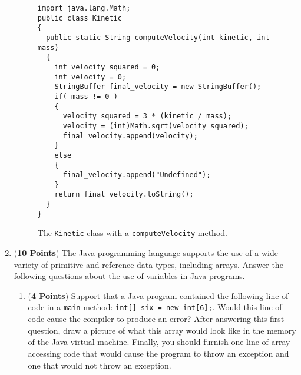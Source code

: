 \documentclass[12pt]{article}
\begin{document}
\begin{enumerate}
\begin{enumerate}






\end{enumerate}

\begin{figure}[p]

\begin{verbatim}
import java.lang.Math;
public class Kinetic
{
  public static String computeVelocity(int kinetic, int mass)
  {
    int velocity_squared = 0;
    int velocity = 0;
    StringBuffer final_velocity = new StringBuffer();
    if( mass != 0 )
    {
      velocity_squared = 3 * (kinetic / mass);
      velocity = (int)Math.sqrt(velocity_squared);
      final_velocity.append(velocity);
    }
    else
    {
      final_velocity.append("Undefined");
    }
    return final_velocity.toString();
  }
}
\end{verbatim}

\caption{The {\tt Kinetic} class with a {\tt computeVelocity} method.}
\label{Kinetic}

\end{figure}

\newpage

\item ({\bf 10 Points}) The Java programming language supports the use
  of a wide variety of primitive and reference data types, including
  arrays.  Answer the following questions about the use of variables
  in Java programs.

\begin{enumerate}

\item ({\bf 4 Points}) Support that a Java program contained the
  following line of code in a {\tt main} method: {\tt int[] six = new
    int[6];}.  Would this line of code cause the compiler to produce
  an error?  After answering this first question, draw a picture of
  what this array would look like in the memory of the Java virtual
  machine.  Finally, you should furnish one line of array-accessing
  code that would cause the program to throw an exception and one that
  would not throw an exception.


\end{enumerate}
\end{enumerate}
\end{document}
